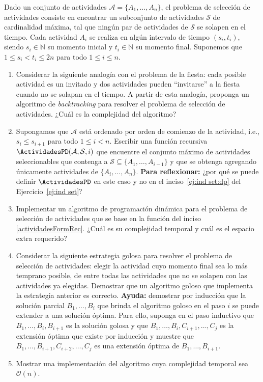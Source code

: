 

\item  Dado un conjunto de actividades $\mathcal{A} = \{A_1, \ldots, A_n\}$, el problema de selección de actividades consiste en encontrar un subconjunto de actividades $\mathcal{S}$ de cardinalidad máxima, tal que ningún par de actividades de $\mathcal{S}$ se solapen en el tiempo.  Cada actividad $A_i$ se realiza en algún intervalo de tiempo $(s_i, t_i)$, siendo $s_i \in \mathbb{N}$ su momento inicial y $t_i \in \mathbb{N}$ su momento final.  Suponemos que $1 \leq s_i < t_i \leq 2n$ para todo $1 \leq i \leq n$.

 \begin{enumerate}[label=$\alph*)$,ref=$\alph*)$]
  \item Considerar la siguiente analogía con el problema de la fiesta: cada posible actividad es un invitado y dos actividades pueden ``invitarse'' a la fiesta cuando no se solapan en el tiempo.  A partir de esta analogía, proponga un algoritmo de \textit{backtracking} para resolver el problema de selección de actividades.  ¿Cuál es la complejidad del algoritmo?

  \item Supongamos que $\mathcal{A}$ está ordenado por orden de comienzo de la actividad, i.e., $s_i \leq s_{i+1}$ para todo $1 \leq i < n$.  Escribir una función recursiva $\ActividadesPD(\mathcal{A}, \mathcal{S}, i)$ que encuentre el conjunto máximo de actividades seleccionables que contenga a $\mathcal{S} \subseteq \{A_1, \ldots, A_{i-1}\}$ y que se obtenga agregando únicamente actividades de $\{A_i, \ldots, A_{n}\}$.  \textbf{Para reflexionar:} ¿por qué se puede definir $\ActividadesPD$ en este caso y no en el inciso~\ref{ej:ind set:dp} del Ejercicio~\ref{ej:ind set}?
  \label{actividadesFormRec}

  \item Implementar un algoritmo de programación dinámica para el problema de selección de actividades que se base en la función del inciso \ref{actividadesFormRec}. ¿Cuál es su complejidad temporal y cuál es el espacio extra requerido?

 \item Considerar la siguiente estrategia golosa para resolver el problema de selección de actividades: elegir la actividad cuyo momento final sea lo más temprano posible, de entre todas las actividades que no se solapen con las actividades ya elegidas.  Demostrar que un algoritmo goloso que implementa la estrategia anterior es correcto. \textbf{Ayuda:} demostrar por inducción que la solución parcial $B_1, \ldots, B_i$ que brinda el algoritmo goloso en el paso $i$ se puede extender a una solución óptima.  Para ello, suponga en el paso inductivo que $B_1, \ldots, B_i, B_{i+1}$ es la solución golosa y que $B_1, \ldots, B_i, C_{i+1}, \ldots, C_{j}$ es la extensión óptima que existe por inducción y muestre que $B_1, \ldots, B_{i+1}, C_{i+2}, \ldots, C_j$ es una extensión óptima de $B_1, \ldots, B_{i+1}$.

  \item Mostrar una implementación del algoritmo cuya complejidad temporal sea $\mathcal{O}(n)$.
 \end{enumerate}

